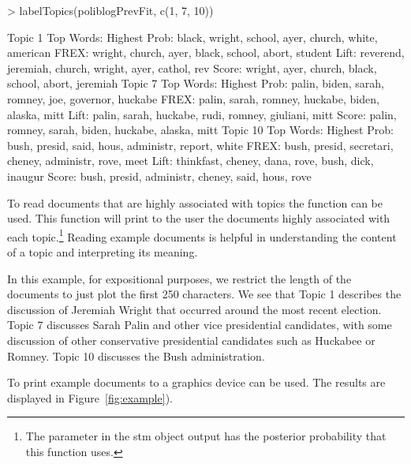\documentclass[nojss]{jss}
\begin{document}
\begin{Schunk}
\begin{Sinput}
> labelTopics(poliblogPrevFit, c(1, 7, 10))
\end{Sinput}
\begin{Soutput}
Topic 1 Top Words:
 	 Highest Prob: black, wright, school, ayer, church, white, american 
 	 FREX: wright, church, ayer, black, school, abort, student 
 	 Lift: reverend, jeremiah, church, wright, ayer, cathol, rev 
 	 Score: wright, ayer, church, black, school, abort, jeremiah 
Topic 7 Top Words:
 	 Highest Prob: palin, biden, sarah, romney, joe, governor, huckabe 
 	 FREX: palin, sarah, romney, huckabe, biden, alaska, mitt 
 	 Lift: palin, sarah, huckabe, rudi, romney, giuliani, mitt 
 	 Score: palin, romney, sarah, biden, huckabe, alaska, mitt 
Topic 10 Top Words:
 	 Highest Prob: bush, presid, said, hous, administr, report, white 
 	 FREX: bush, presid, secretari, cheney, administr, rove, meet 
 	 Lift: thinkfast, cheney, dana, rove, bush, dick, inaugur 
 	 Score: bush, presid, administr, cheney, said, hous, rove 
\end{Soutput}
\end{Schunk}

To read documents that are highly associated with topics the  function can be used. This function will print to the user the documents highly associated with each topic.\footnote{The  parameter in the stm object output has the posterior probability that this function uses.} Reading example documents is helpful in understanding the content of a topic and interpreting its meaning.

In this example, for expositional purposes, we restrict the length of the documents to just plot the first 250 characters. We see that Topic 1 describes the discussion of Jeremiah Wright that occurred around the most recent election. Topic 7 discusses Sarah Palin and other vice presidential candidates, with some discussion of other conservative presidential candidates such as Huckabee or Romney. Topic 10 discusses the Bush administration.

To print example documents to a graphics device  can be used. The results are displayed in Figure~\ref{fig:example}).

\begin{Schunk}
\end{Schunk}
\end{document}
